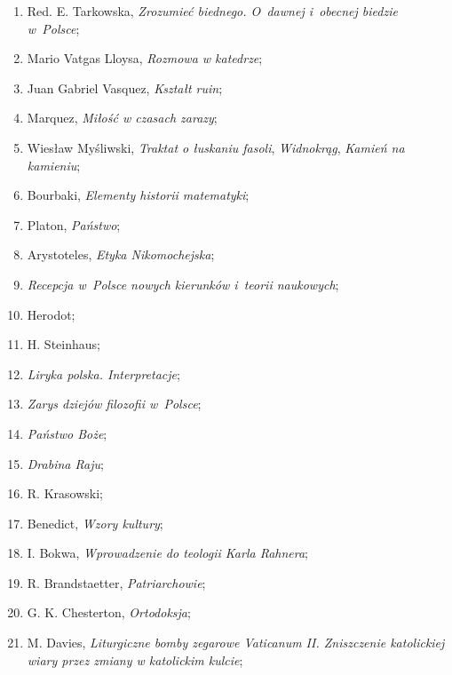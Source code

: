 \documentclass[a4paper,11pt]{article}
\begin{document}
\begin{enumerate}
\item Red. E. Tarkowska, \textit{Zrozumieć biednego. O~dawnej i~obecnej
    biedzie w~Polsce};

\item Mario Vatgas Lloysa, \textit{Rozmowa w katedrze};

\item Juan Gabriel Vasquez, \textit{Kształt ruin};

\item Marquez, \textit{Miłość w czasach zarazy};

\item Wiesław Myśliwski, \textit{Traktat o łuskaniu fasoli},
  \textit{Widnokrąg}, \textit{Kamień na kamieniu};

\item Bourbaki, \textit{Elementy historii matematyki};

\item Platon, \textit{Państwo};

\item Arystoteles, \textit{Etyka Nikomochejska};

\item \textit{Recepcja w~Polsce nowych kierunków i~teorii naukowych};

\item Herodot;

\item H. Steinhaus;

\item \textit{Liryka polska. Interpretacje};

\item \textit{Zarys dziejów filozofii w~Polsce};

\item \textit{Państwo Boże};

\item \textit{Drabina Raju};

\item R. Krasowski;

\item Benedict, \textit{Wzory kultury};

\item I. Bokwa, \textit{Wprowadzenie do teologii Karla Rahnera};

\item R. Brandstaetter, \textit{Patriarchowie};

\item G. K. Chesterton, \textit{Ortodoksja};

\item M. Davies, \textit{Liturgiczne bomby zegarowe Vaticanum II.
    Zniszczenie katolickiej wiary przez zmiany w katolickim kulcie};


\end{enumerate}
\end{document}
